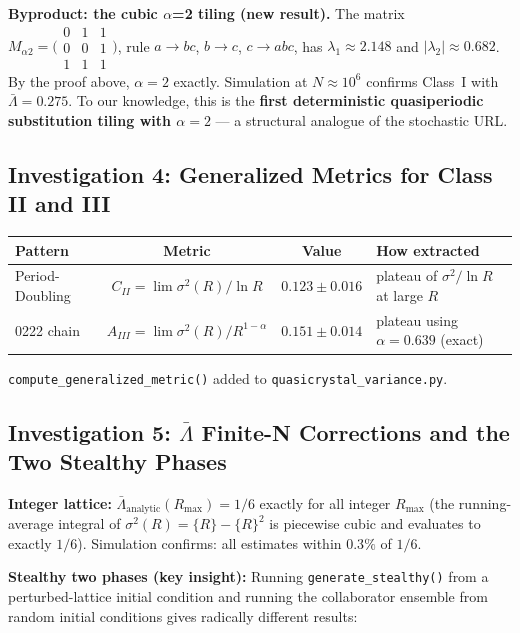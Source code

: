 \documentclass[11pt,letterpaper]{article}
\begin{document}
\medskip
\textbf{Byproduct: the cubic $\alpha$=2 tiling (new result).}
The matrix
$M_{\alpha2} = \bigl(\begin{smallmatrix}0&1&1\\0&0&1\\1&1&1\end{smallmatrix}\bigr)$,
rule $a\to bc$, $b\to c$, $c\to abc$, has $\lambda_1\approx2.148$ and $|\lambda_2|\approx0.682$.
By the proof above, $\alpha=2$ exactly. Simulation at $N\approx10^6$ confirms Class~I with
$\bar\Lambda=0.275$. To our knowledge, this is the \textbf{first deterministic quasiperiodic substitution
tiling with $\alpha=2$} --- a structural analogue of the stochastic URL.

\subsection{Investigation 4: Generalized Metrics for Class II and III}

\begin{table}[H]\centering
\begin{tabular}{lccl}
\toprule
\textbf{Pattern} & \textbf{Metric} & \textbf{Value} & \textbf{How extracted} \\
\midrule
Period-Doubling & $C_{II} = \lim\sigma^2(R)/\ln R$ & $0.123\pm0.016$ & plateau of $\sigma^2/\ln R$ at large $R$ \\
0222 chain & $A_{III} = \lim\sigma^2(R)/R^{1-\alpha}$ & $0.151\pm0.014$ & plateau using $\alpha=0.639$ (exact) \\
\bottomrule
\end{tabular}
\end{table}

\texttt{compute\_generalized\_metric()} added to \texttt{quasicrystal\_variance.py}.

\subsection{Investigation 5: $\bar\Lambda$ Finite-N Corrections and the Two Stealthy Phases}

\textbf{Integer lattice:} $\bar\Lambda_\text{analytic}(R_\text{max}) = 1/6$ exactly for all integer
$R_\text{max}$ (the running-average integral of $\sigma^2(R)=\{R\}-\{R\}^2$ is piecewise cubic
and evaluates to exactly $1/6$). Simulation confirms: all estimates within $0.3\%$ of $1/6$.

\medskip
\textbf{Stealthy two phases (key insight):}
Running \texttt{generate\_stealthy()} from a perturbed-lattice initial condition and
running the collaborator ensemble from random initial conditions gives radically different results:
\end{document}
